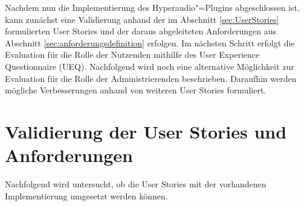 \label{cap:evaluation}
Nachdem nun die Implementierung des Hyperaudio"=Plugins abgeschlossen ist, kann zunächst eine Validierung anhand der im Abschnitt \ref{sec:UserStories} formulierten User Stories und der daraus abgeleiteten Anforderungen aus Abschnitt \ref{sec:anforderungsdefinition} erfolgen. Im nächsten Schritt erfolgt die Evaluation für die Rolle der Nutzenden mithilfe des User Experience Questionnaire (UEQ). Nachfolgend wird noch eine alternative Möglichkeit zur Evaluation für die Rolle der Administrierenden beschrieben. Daraufhin werden mögliche Verbesserungen anhand von weiteren User Stories formuliert.





\section{Validierung der User Stories und Anforderungen}
Nachfolgend wird untersucht, ob die User Stories mit der vorhandenen Implementierung umgesetzt werden können.

